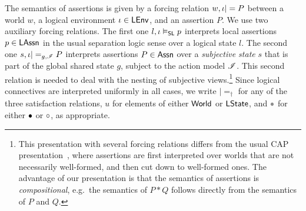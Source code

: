 The semantics of \colosl assertions is given by a forcing relation
$w,\iota|= P$ between a world $w$, a logical environment
$\iota\in\mathsf{LEnv}$, and an assertion $P$. We use two auxiliary forcing
relations. The first one $l,\iota\mathrel{\vDash_{\mathsf{SL}}} p$ interprets local assertions
$p\in\mathsf{LAssn}$ in the usual separation logic sense over a logical
state $l$. The second one $s,\iota|=_{g,\mathscr{I}} P$ interprets
assertions $P\in\mathsf{Assn}$ over a \emph{subjective state} $s$ that
is part of the global shared state $g$, subject to the action model
$\mathscr{I}$. This second relation  is needed to deal with the
nesting of subjective views.\footnote{This presentation with several
  forcing relations differs from the usual CAP
  presentation~\cite{cap-ecoop10}, where assertions are first
  interpreted over worlds that are not necessarily well-formed, and
  then cut down to well-formed ones. The advantage of our presentation
  is that the semantics of assertions is \emph{compositional},
  e.g.\ the semantics of $P * Q$ follows directly from the semantics
  of $P$ and $Q$.}  Since logical connectives are interpreted
uniformly in all cases, we write $|=_\dagger$ for any of the three
satisfaction relations, $u$ for elements of either $\mathsf{World}$ or
$\mathsf{LState}$, and $\grey$ for either $\bullet$ or $\circ$, as
appropriate.

